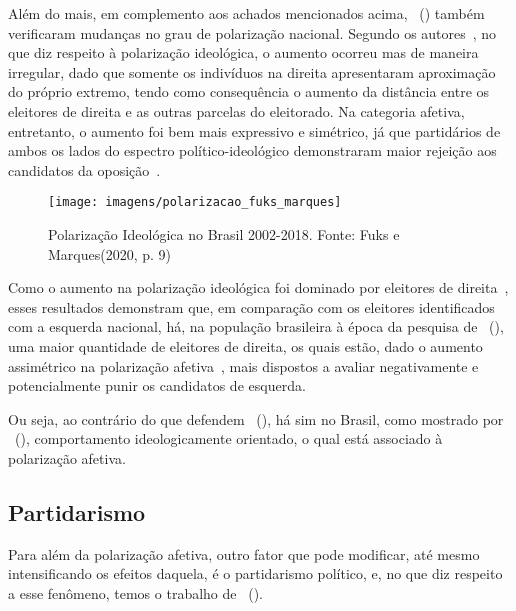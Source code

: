 \documentclass[
	12pt,				%
	openright,			%
	twoside,			%
	a4paper,			%
	openany,
	english,			%
	brazil				%
	]{abntex2}
\begin{document}
Além do mais, em complemento aos achados mencionados acima, ~(\citeyear{fuks2020afeto}) também verificaram mudanças no grau de polarização nacional. Segundo os autores~\cite{fuks2020afeto}, no que diz respeito à polarização ideológica, o aumento ocorreu mas de maneira irregular, dado que somente os indivíduos na direita apresentaram aproximação do próprio extremo, tendo como consequência o aumento da distância entre os eleitores de direita e as outras parcelas do eleitorado. Na categoria afetiva, entretanto, o aumento foi bem mais expressivo e simétrico, já que partidários de ambos os lados do espectro político-ideológico demonstraram maior rejeição aos candidatos da oposição~\cite{fuks2020afeto}.\\ %

\begin{figure}[htp!]
	\centering
	\texttt{[image: imagens/polarizacao\_fuks\_marques]}\hspace{\fill}
	\caption{Polarização Ideológica no Brasil 2002-2018. Fonte: Fuks e Marques(2020, p. 9)}
	\label{fig:polarizacaofuksmarques}
\end{figure}

Como o aumento na polarização ideológica foi dominado por eleitores de direita~\cite{fuks2020afeto}, esses resultados demonstram que, em comparação com os eleitores identificados com a esquerda nacional, há, na população brasileira à época da pesquisa de ~(\citeyear{fuks2020afeto}), uma maior quantidade de eleitores de direita, os quais estão, dado o aumento assimétrico na polarização afetiva~\cite{fuks2020afeto}, mais dispostos a avaliar negativamente e potencialmente punir os candidatos de esquerda.

Ou seja, ao contrário do que defendem ~(\citeyear{Oliveira2015Sep}), há sim no Brasil, como mostrado por ~(\citeyear{fuks2020afeto}), comportamento ideologicamente orientado, o qual está associado à polarização afetiva.

\subsection{Partidarismo}


Para além da polarização afetiva, outro fator que pode modificar, até mesmo intensificando os efeitos daquela, é o partidarismo político, e, no que diz respeito a esse fenômeno, temos o trabalho de ~(\citeyear{Samuels2014Jan}).
\end{document}

